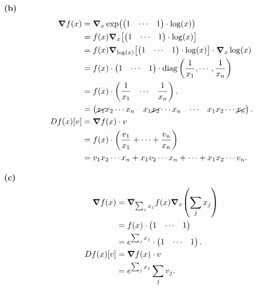 \documentclass{article}
\makeatletter
\newcommand*{\shifttext}[1]{%
  \settowidth{\@tempdima}{#1}%
  \hspace{-\@tempdima}#1%
}
\newcommand{\plabel}[1]{%
\shifttext{\textbf{#1}\quad}%
}
\newcommand{\minusbaseline}{\abovedisplayskip=0pt\abovedisplayshortskip=0pt~\vspace*{-\baselineskip}}%
\makeatother
\begin{document}
\plabel{(b)}%
\begingroup\minusbaseline%
\begin{align*}
    \grad f(x) &= \grad_x \exp(\begin{pmatrix}
        1 & \cdots & 1
    \end{pmatrix} \cdot \log(x)) \\
    &= f(x) \grad_x \qty[\begin{pmatrix}
        1 & \cdots & 1
    \end{pmatrix} \cdot \log(x)] \\
    &= f(x) \grad_{\log(x)}\qty[ \begin{pmatrix}
        1 & \cdots & 1
    \end{pmatrix} \cdot \log(x) ] \cdot \grad_x \log(x) \\
    &= f(x) \cdot \begin{pmatrix}
        1 & \cdots & 1
    \end{pmatrix} \cdot \operatorname{diag}\qty(\frac{1}{x_1},\cdots,\frac{1}{x_n}) \\
    &= f(x) \cdot \begin{pmatrix} \displaystyle \frac{1}{x_1} & \cdots & \displaystyle \frac{1}{x_n} \end{pmatrix}. \\
    &= \begin{pmatrix}
        \cancel{x_1} x_2 \cdots x_n & x_1 \cancel{x_2} \cdots x_n & \cdots & x_1 x_2 \cdots \cancel{x_n}
    \end{pmatrix}. \\
    Df(x)[v] &= \grad f(x) \cdot v \\
    &= f(x) \cdot \qty(\frac{v_1}{x_1} + \cdots + \frac{v_n}{x_n}) \\
    &= v_1 x_2 \cdots x_n + x_1 v_2 \cdots x_n + \cdots + x_1 x_2 \cdots v_n.
\end{align*}
\endgroup

\plabel{(c)}%
\begingroup\minusbaseline
\begin{align*}
    \grad f(x) &= \grad_{\sum_j x_j} f(x) \grad_x \qty(\sum_j x_j) \\
    &= f(x) \cdot \begin{pmatrix}
        1 & \cdots & 1
    \end{pmatrix} \\
    &= e^{\sum_j x_j} \cdot \begin{pmatrix}
        1 & \cdots & 1
    \end{pmatrix}. \\
    D f(x) [v] &= \grad f(x) \cdot v \\
    &= e^{\sum_j x_j} \sum_j v_j.
\end{align*}
\endgroup
\end{document}
